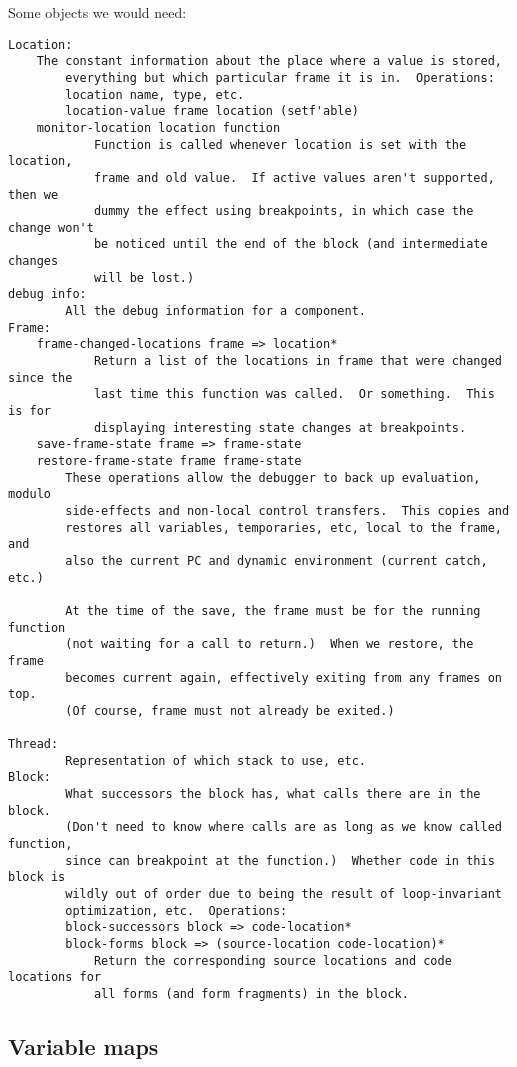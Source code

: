 Some objects we would need:
\begin{verbatim}
Location:
	The constant information about the place where a value is stored,
        everything but which particular frame it is in.  Operations:
        location name, type, etc.
        location-value frame location (setf'able)
	monitor-location location function
            Function is called whenever location is set with the location,
            frame and old value.  If active values aren't supported, then we
            dummy the effect using breakpoints, in which case the change won't
            be noticed until the end of the block (and intermediate changes
            will be lost.)
debug info:
        All the debug information for a component.
Frame:
	frame-changed-locations frame => location*
            Return a list of the locations in frame that were changed since the
            last time this function was called.  Or something.  This is for
            displaying interesting state changes at breakpoints.
	save-frame-state frame => frame-state
	restore-frame-state frame frame-state
	    These operations allow the debugger to back up evaluation, modulo
	    side-effects and non-local control transfers.  This copies and
	    restores all variables, temporaries, etc, local to the frame, and
	    also the current PC and dynamic environment (current catch, etc.)

	    At the time of the save, the frame must be for the running function
	    (not waiting for a call to return.)  When we restore, the frame
	    becomes current again, effectively exiting from any frames on top.
	    (Of course, frame must not already be exited.)
       
Thread:
        Representation of which stack to use, etc.
Block:
        What successors the block has, what calls there are in the block.
        (Don't need to know where calls are as long as we know called function,
        since can breakpoint at the function.)  Whether code in this block is
        wildly out of order due to being the result of loop-invariant
        optimization, etc.  Operations:
        block-successors block => code-location*
        block-forms block => (source-location code-location)*
            Return the corresponding source locations and code locations for
            all forms (and form fragments) in the block.
\end{verbatim}



\subsection{Variable maps}


